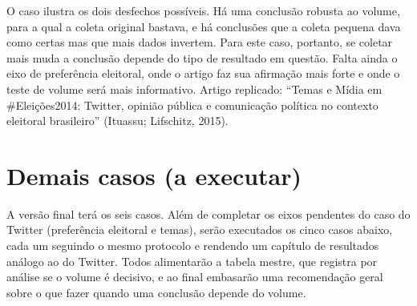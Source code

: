 \documentclass[12pt,a4paper]{article}
\begin{document}
O caso ilustra os dois desfechos possíveis. Há uma conclusão robusta ao
volume, para a qual a coleta original bastava, e há conclusões que a coleta pequena
dava como certas mas que mais dados invertem. Para este caso, portanto, se coletar
mais muda a conclusão depende do tipo de resultado em questão. Falta ainda o eixo
de preferência eleitoral, onde o artigo faz sua afirmação mais forte e onde o teste
de volume será mais informativo. Artigo replicado: ``Temas e Mídia em
\#Eleições2014: Twitter, opinião pública e comunicação política no contexto
eleitoral brasileiro'' (Ituassu; Lifschitz, 2015).

\section{Demais casos (a executar)}
\label{sec:futuro}

A versão final terá os seis casos. Além de completar os eixos pendentes do caso do
Twitter (preferência eleitoral e temas), serão executados os cinco casos abaixo,
cada um seguindo o mesmo protocolo e rendendo um capítulo de resultados análogo ao
do Twitter. Todos alimentarão a tabela mestre, que registra por análise se o
volume é decisivo, e ao final embasarão uma recomendação geral sobre o que fazer
quando uma conclusão depende do volume.
\end{document}
